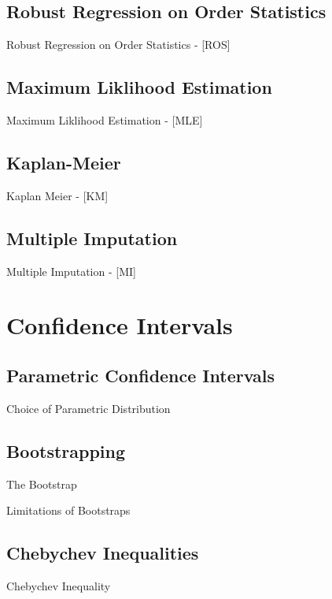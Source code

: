 \documentclass{beamer}
\begin{document}
\subsection{Robust Regression on Order Statistics}

\begin{frame}{Robust Regression on Order Statistics - [ROS] }

\end{frame}


\subsection{Maximum Liklihood Estimation}

\begin{frame}{Maximum Liklihood Estimation - [MLE] }

\end{frame}


\subsection{Kaplan-Meier}

\begin{frame}{Kaplan Meier - [KM] }

\end{frame}

\subsection{Multiple Imputation}

\begin{frame}{Multiple Imputation - [MI] }

\end{frame}



\section{Confidence Intervals}

\subsection{Parametric Confidence Intervals}

\begin{frame}{Choice of Parametric Distribution}

\end{frame}


\subsection{Bootstrapping}

\begin{frame}{The Bootstrap}

\end{frame}
 
\begin{frame}{Limitations of Bootstraps}

\end{frame}

\subsection{Chebychev Inequalities}

\begin{frame}{Chebychev Inequality}

\end{frame}
\end{document}
